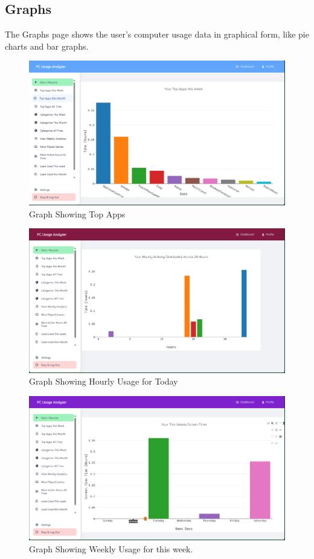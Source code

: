 \documentclass[openany]{report}
\begin{document}
\subsection{Graphs}
The Graphs page shows the user's computer usage data in graphical form, like pie charts and bar graphs.\\

\begin{figure}[H]
    \centering
    \includegraphics[width=.95\textwidth]{screenshots/top apps.png}
    \caption{Graph Showing Top Apps}
\end{figure}
\begin{figure}[H]
    \centering
    \includegraphics[width=.95\textwidth]{screenshots/hourly.png}
    \caption{Graph Showing Hourly Usage for Today}
\end{figure}
\begin{figure}[H]
    \centering
    \includegraphics[width=.95\textwidth]{screenshots/weekly.png}
    \caption{Graph Showing Weekly Usage for this week. }
\end{figure}
\end{document}
